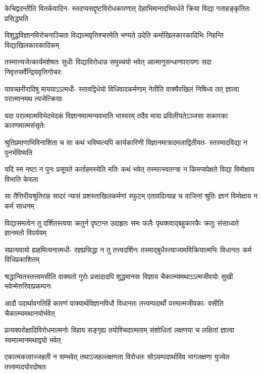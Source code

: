 \fourlineindentedshloka
{केचिद्वदन्तीति वितर्कवादिन-}
{स्तदप्यसद्दृष्टविरोधकारणात्}
{देहाभिमानादभिवर्धते क्रिया}
{विद्या गताहङ्कृतितः प्रसिद्ध्यति} %

\fourlineindentedshloka
{विशुद्धविज्ञानविरोचनाञ्चिता}
{विद्यात्मवृत्तिश्चरमेति भण्यते}
{उदेति कर्माखिलकारकादिभिः}
{निहन्ति विद्याखिलकारकादिकम्} %

\fourlineindentedshloka
{तस्मात्त्यजेत्कार्यमशेषतः सुधीः}
{विद्याविरोधान्न समुच्चयो भवेत्}
{आत्मानुसन्धानपरायणः सदा}
{निवृत्तसर्वेन्द्रियवृत्तिगोचरः} %

\fourlineindentedshloka
{यावच्छरीरादिषु माययाऽऽत्मधी-}
{स्तावद्विधेयो विधिवादकर्मणाम्}
{नेतीति वाक्यैरखिलं निषिध्य तत्}
{ज्ञात्वा परात्मानमथ त्यजेत्क्रियाः} %

\fourlineindentedshloka
{यदा परात्मात्मविभेदभेदकं}
{विज्ञानमात्मन्यवभाति भास्वरम्}
{तदैव माया प्रविलीयतेऽञ्जसा}
{सकारका कारणमात्मसंसृतेः} %

\fourlineindentedshloka
{श्रुतिप्रमाणाभिविनाशिता च सा}
{कथं भविष्यत्यपि कार्यकारिणी}
{विज्ञानमात्रादमलाद्वितीयत-}
{स्तस्मादविद्या न पुनर्भविष्यति} %

\fourlineindentedshloka
{यदि स्म नष्टा न पुनः प्रसूयते}
{कर्ताहमस्येति मतिः कथं भवेत्}
{तस्मात्स्वतन्त्रा न किमप्यपेक्षते}
{विद्या विमोक्षाय विभाति केवला} %

\fourlineindentedshloka
{सा तैत्तिरीयश्रुतिराह सादरं}
{न्यासं प्रशस्ताखिलकर्मणां स्फुटम्}
{एतावदित्याह च वाजिनां श्रुतिः}
{ज्ञानं विमोक्षाय न कर्म साधनम्} %

\fourlineindentedshloka
{विद्यासमत्वेन तु दर्शितस्त्वया}
{क्रतुर्न दृष्टान्त उदाहृतः समः}
{फलैः पृथक्त्वाद्बहुकारकैः क्रतुः}
{संसाध्यते ज्ञानमतो विपर्ययम्} %

\fourlineindentedshloka
{सप्रत्यवायो ह्यहमित्यनात्मधी-}
{रज्ञप्रसिद्धा न तु तत्त्वदर्शिनः}
{तस्माद्बुधैस्त्याज्यमविक्रियात्मभिः}
{विधानतः कर्म विधिप्रकाशितम्} %

\fourlineindentedshloka
{श्रद्धान्वितस्तत्त्वमसीति वाक्यतो}
{गुरोः प्रसादादपि शुद्धमानसः}
{विज्ञाय चैकात्म्यमथाऽऽत्मजीवयोः}
{सुखी भवेन्मेरुरिवाप्रकम्पनः} %

\fourlineindentedshloka
{आदौ पदार्थावगतिर्हि कारणं}
{वाक्यार्थविज्ञानविधौ विधानतः}
{तत्त्वम्पदार्थौ परमात्मजीवका-}
{वसीति चैकात्म्यमथानयोर्भवेत्} %

\fourlineindentedshloka
{प्रत्यक्परोक्षादिविरोधमात्मनोः}
{विहाय सङ्गृह्य तयोश्चिदात्मताम्}
{संशोधितां लक्षणया च लक्षितां}
{ज्ञात्वा स्वमात्मानमथाद्वयो भवेत्} %

\fourlineindentedshloka
{एकात्मकत्वाज्जहती न सम्भवेत्}
{तथाऽजहल्लक्षणता विरोधतः}
{सोऽयम्पदार्थाविव भागलक्षणा}
{युज्येत तत्त्वम्पदयोरदोषतः} %


